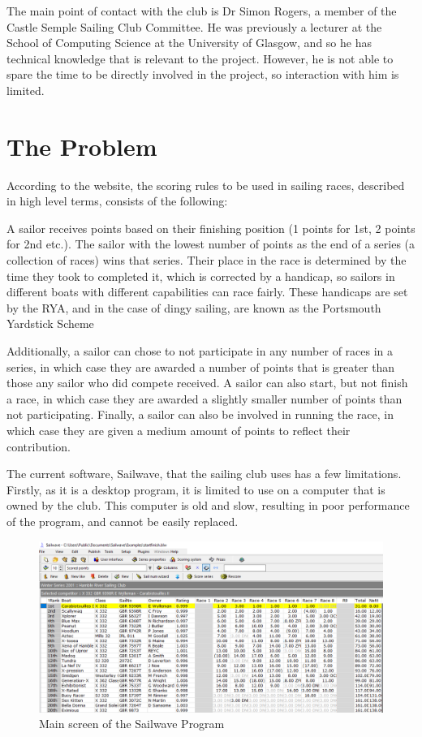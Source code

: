 \documentclass{l4proj}
\begin{document}
The main point of contact with the club is Dr Simon Rogers, a member of the Castle Semple Sailing Club Committee. He was previously a lecturer at the School of Computing Science at the University of Glasgow, and so he has technical knowledge that is relevant to the project. However, he is not able to spare the time to be directly involved in the project, so interaction with him is limited.

\section{The Problem}
According to the \citet{RYAscore} website, the scoring rules to be used in sailing races, described in high level terms, consists of the following:

A sailor receives points based on their finishing position (1 points for 1st, 2 points for 2nd etc.). The sailor with the lowest number of points as the end of a series (a collection of races) wins that series. Their place in the race is determined by the time they took to completed it, which is corrected by a handicap, so sailors in different boats with different capabilities can race fairly. These handicaps are set by the RYA, and in the case of dingy sailing, are known as the Portsmouth Yardstick Scheme
\citep{RYApy}

Additionally, a sailor can chose to not participate in any number of races in a series, in which case they are awarded a number of points that is greater than those any sailor who did compete received. A sailor can also start, but not finish a race, in which case they are awarded a slightly smaller number of points than not participating. Finally, a sailor can also be involved in running the race, in which case they are given a medium amount of points to reflect their contribution.

The current software, Sailwave, that the sailing club uses has a few limitations. Firstly, as it is a desktop program, it is limited to use on a computer that is owned by the club. This computer is old and slow, resulting in poor performance of the program, and cannot be easily replaced.

\begin{figure}[h!]
    \centering
    \includegraphics[width=0.6\linewidth]{images/Sailwave.png} 

    \caption{Main screen of the Sailwave Program \citep{sailwave}
    }

    \label{fig:Sailwave} 
\end{figure}
\end{document}
